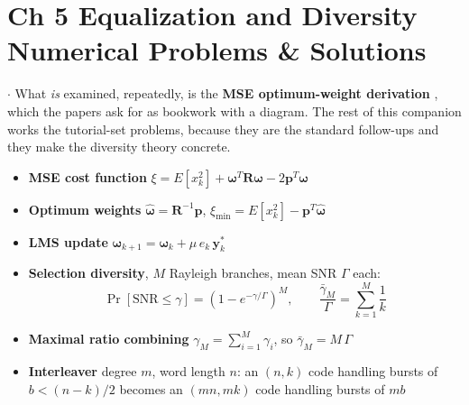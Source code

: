 \section*{\color{acc}Ch 5 \textperiodcentered{} Equalization and Diversity \gap
\textcolor{sub}{Numerical Problems \& Solutions}}
\vspace{-4pt}{\color{acc}\rule{\textwidth}{1.1pt}}\vspace{4pt}

{\color{sub}\footnotesize {} \gap$\cdot$\gap {}
What \emph{is} examined, repeatedly, is the \textbf{MSE optimum-weight derivation} , which
the papers ask for as bookwork with a diagram. The rest of this companion works the tutorial-set
problems, because they are the standard follow-ups and they make the diversity theory concrete.}

\begin{itemize}
  \item \textbf{MSE cost function} \;
        $\xi = E[x_k^2] + \boldsymbol{\omega}^T\mathbf{R}\boldsymbol{\omega}
             - 2\mathbf{p}^T\boldsymbol{\omega}$
  \item \textbf{Optimum weights} \;
        $\hat{\boldsymbol{\omega}} = \mathbf{R}^{-1}\mathbf{p}$, \qquad
        $\xi_{\min} = E[x_k^2] - \mathbf{p}^T\hat{\boldsymbol{\omega}}$
  \item \textbf{LMS update} \;
        $\boldsymbol{\omega}_{k+1} = \boldsymbol{\omega}_k + \mu\,e_k\,\mathbf{y}_k^{*}$
  \item \textbf{Selection diversity}, $M$ Rayleigh branches, mean SNR $\Gamma$ each:
        \[ \Pr[\text{SNR} \le \gamma] = \left(1 - e^{-\gamma/\Gamma}\right)^{M},
           \qquad \frac{\bar{\gamma}_M}{\Gamma} = \sum_{k=1}^{M}\frac{1}{k} \]
  \item \textbf{Maximal ratio combining} \;
        $\displaystyle \gamma_M = \sum_{i=1}^{M}\gamma_i$, so
        $\bar{\gamma}_M = M\,\Gamma$
  \item \textbf{Interleaver} \; degree $m$, word length $n$: an $(n,k)$ code handling bursts of
        $b < (n-k)/2$ becomes an $(mn, mk)$ code handling bursts of $mb$
\end{itemize}

\hr

